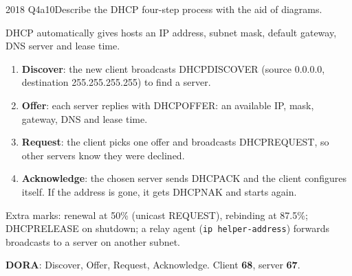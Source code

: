 \documentclass[10pt]{article}
\begin{document}
\begin{pastq}{2018 Q4a}{10}Describe the DHCP four-step process with the aid of diagrams.\end{pastq}
\begin{center}
\end{center}
\begin{ans}
DHCP automatically gives hosts an IP address, subnet mask, default gateway, DNS server and lease time.
\begin{enumerate}
\item \textbf{Discover}: the new client broadcasts DHCPDISCOVER (source 0.0.0.0, destination 255.255.255.255) to find a server.
\item \textbf{Offer}: each server replies with DHCPOFFER: an available IP, mask, gateway, DNS and lease time.
\item \textbf{Request}: the client picks one offer and broadcasts DHCPREQUEST, so other servers know they were declined.
\item \textbf{Acknowledge}: the chosen server sends DHCPACK and the client configures itself. If the address is gone, it gets DHCPNAK and starts again.
\end{enumerate}
Extra marks: renewal at 50\% (unicast REQUEST), rebinding at 87.5\%; DHCPRELEASE on shutdown; a relay agent (\texttt{ip helper-address}) forwards broadcasts to a server on another subnet.
\end{ans}
\begin{mnemonic}\textbf{DORA}: Discover, Offer, Request, Acknowledge. Client \textbf{68}, server \textbf{67}.\end{mnemonic}
\end{document}
